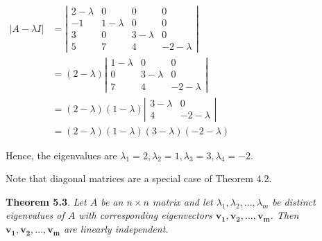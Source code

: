 \documentclass[
  letterpaper,
  DIV=11,
  numbers=noendperiod]{scrartcl}
\theoremstyle{remark}
\begin{document}
\(\begin{alignedat}{2}
        |A - \lambda I| &= \left|\begin{array}{cccc} 2-\lambda & 0 & 0 & 0 \\ -1 & 1-\lambda & 0 & 0 \\ 3 & 0 & 3-\lambda & 0 \\ 5 & 7 & 4 & -2-\lambda \end{array}\right| \\
        {} &= (2-\lambda )\left|\begin{array}{ccc} 1-\lambda & 0 & 0 \\ 0 & 3-\lambda & 0 \\ 7 & 4 & -2-\lambda \end{array}\right| \\
        {} &= (2-\lambda )(1-\lambda )\left|\begin{array}{cc} 3-\lambda & 0 \\ 4 & -2-\lambda \end{array}\right| \\
        {} &= (2-\lambda )(1-\lambda )(3-\lambda )(-2-\lambda )
    \end{alignedat}\)

Hence, the eigenvalues are
\(\lambda _{1}=2, \lambda _{2}=1, \lambda _{3}=3, \lambda _{4}=-2\).

Note that diagonal matrices are a special case of Theorem 4.2.

\textbf{Theorem 5.3}. \emph{Let \(A\) be an \(n \times n\) matrix and
let \(\lambda _{1}, \lambda _{2}, ..., \lambda _{m}\) be distinct
eigenvalues of \(A\) with corresponding eigenvectors
\(\mathbf{v_{1}}, \mathbf{v_{2}}, ..., \mathbf{v_{m}}\). Then
\(\mathbf{v_{1}}, \mathbf{v_{2}}, ..., \mathbf{v_{m}}\) are linearly
independent.}
\end{document}
